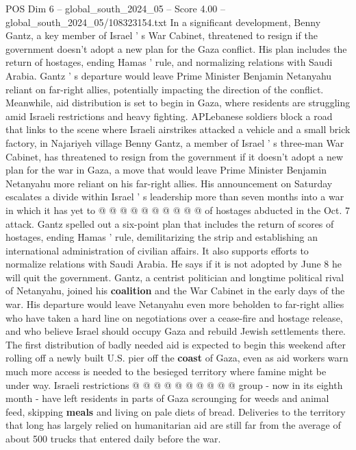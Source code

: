 \begin{textsample}{POS Dim 6 – global\_south\_2024\_05 – Score 4.00 – global\_south\_2024\_05/108323154.txt}  \label{ex:f6_pos_218}
In a significant development, Benny Gantz, a key member of Israel ' s War Cabinet, threatened to resign if the government doesn't adopt a new plan for the Gaza conflict.
His plan includes the return of hostages, ending Hamas ' rule, and normalizing relations with Saudi Arabia.
Gantz ' s departure would leave Prime Minister Benjamin Netanyahu reliant on far-right allies, potentially impacting the direction of the conflict.
Meanwhile, aid distribution is set to begin in Gaza, where residents are struggling amid Israeli restrictions and heavy fighting.
APLebanese soldiers block a road that links to the scene where Israeli airstrikes attacked a vehicle and a small brick factory, in Najariyeh village Benny Gantz, a member of Israel ' s three-man War Cabinet, has threatened to resign from the government if it doesn't adopt a new plan for the war in Gaza, a move that would leave Prime Minister Benjamin Netanyahu more reliant on his far-right allies.
His announcement on Saturday escalates a divide within Israel ' s leadership more than seven months into a war in which it has yet to @ @ @ @ @ @ @ @ @ @ of hostages abducted in the Oct. 7 attack.
Gantz spelled out a six-point plan that includes the return of scores of hostages, ending Hamas ' rule, demilitarizing the strip and establishing an international administration of civilian affairs.
It also supports efforts to normalize relations with Saudi Arabia.
He says if it is not adopted by June 8 he will quit the government.
Gantz, a centrist politician and longtime political rival of Netanyahu, joined his \textbf{coalition} and the War Cabinet in the early days of the war.
His departure would leave Netanyahu even more beholden to far-right allies who have taken a hard line on negotiations over a cease-fire and hostage release, and who believe Israel should occupy Gaza and rebuild Jewish settlements there.
The first distribution of badly needed aid is expected to begin this weekend after rolling off a newly built U.S. pier off the \textbf{coast} of Gaza, even as aid workers warn much more access is needed to the besieged territory where famine might be under way.
Israeli restrictions @ @ @ @ @ @ @ @ @ @ group - now in its eighth month - have left residents in parts of Gaza scrounging for weeds and animal feed, skipping \textbf{meals} and living on pale diets of bread.
Deliveries to the territory that long has largely relied on humanitarian aid are still far from the average of about 500 trucks that entered daily before the war.

\end{textsample}
